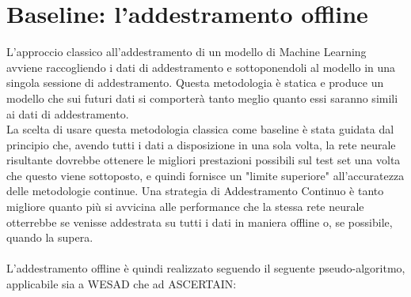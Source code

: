 \section{Baseline: l'addestramento offline}
L'approccio classico all'addestramento di un modello di Machine Learning avviene raccogliendo i dati di addestramento e sottoponendoli al modello in una singola sessione di addestramento. Questa metodologia è statica e produce un modello che sui futuri dati si comporterà tanto meglio quanto essi saranno simili ai dati di addestramento.\\
La scelta di usare questa metodologia classica come baseline è stata guidata dal principio che, avendo tutti i dati a disposizione in una sola volta, la rete neurale risultante dovrebbe ottenere le migliori prestazioni possibili sul test set una volta che questo viene sottoposto, e quindi fornisce un "limite superiore" all'accuratezza delle metodologie continue. Una strategia di Addestramento Continuo è tanto migliore quanto più si avvicina alle performance che la stessa rete neurale otterrebbe se venisse addestrata su tutti i dati in maniera offline o, se possibile, quando la supera.\\\\
L'addestramento offline è quindi realizzato seguendo il seguente pseudo-algoritmo, applicabile sia a WESAD che ad ASCERTAIN:
